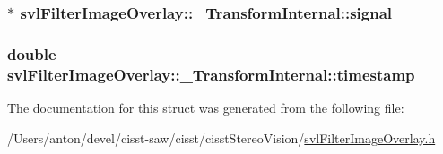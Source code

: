 \subsubsection[{signal}]{$\ast$ svl\+Filter\+Image\+Overlay\+::\+\_\+\+Transform\+Internal\+::signal}\label{structsvl_filter_image_overlay_1_1___transform_internal_a572ad98ec052cca3dc92321d7669c4e6}
\hypertarget{structsvl_filter_image_overlay_1_1___transform_internal_ae2a07acc677c86f82241a0c8594818c4}{}
\subsubsection[{timestamp}]{\setlength{\rightskip}{0pt plus 5cm}double svl\+Filter\+Image\+Overlay\+::\+\_\+\+Transform\+Internal\+::timestamp}\label{structsvl_filter_image_overlay_1_1___transform_internal_ae2a07acc677c86f82241a0c8594818c4}


The documentation for this struct was generated from the following file\+:\begin{DoxyCompactItemize}
\item 
/\+Users/anton/devel/cisst-\/saw/cisst/cisst\+Stereo\+Vision/\hyperlink{svl_filter_image_overlay_8h}{svl\+Filter\+Image\+Overlay.\+h}\end{DoxyCompactItemize}
